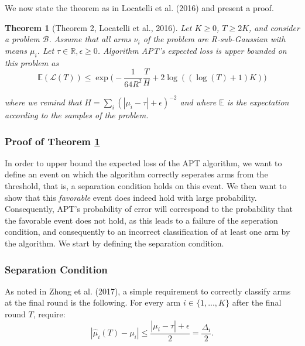 \documentclass[11pt,]{article}
\newtheorem{theorem}{Theorem}
\begin{document}
We now state the theorem as in Locatelli et al. (2016) and present a
proof.

\begin{theorem}[Theorem 2, Locatelli et al., 2016] \label{theorem:LocatelliTheorem4}
Let $K \geq 0$, $T \geq 2K$, and consider a problem $\mathcal{B}$. Assume that all arms $\nu_i$ of the problem are R-sub-Gaussian with means $\mu_i$. Let $\tau \in \mathbb{R}, \epsilon \geq 0$. Algorithm APT's expected loss is upper bounded on this problem as 
\begin{equation*} \mathbb{E}(\mathcal{L}(T)) \leq \exp
\Big(-\frac{1}{64R^2}\frac{T}{H} + 2 \log((\log(T) + 1)K)\Big) \end{equation*}

where we remind that $H = \sum_i (|\mu_i - \tau | + \epsilon)^{-2}$ and where
$\mathbb{E}$ is the expectation according to the samples of the problem.
\end{theorem}

\subsubsection{\texorpdfstring{Proof of Theorem
\ref{theorem:LocatelliTheorem4}
\label{sec:UpperBoundProof}}{Proof of Theorem  }}\label{proof-of-theorem}

In order to upper bound the expected loss of the APT algorithm, we want
to define an event on which the algorithm correctly seperates arms from
the threshold, that is, a separation condition holds on this event. We
then want to show that this \emph{favorable} event does indeed hold with
large probability. Consequently, APT's probability of error will
correspond to the probability that the favorable event does not hold, as
this leads to a failure of the seperation condition, and consequently to
an incorrect classification of at least one arm by the algorithm. We
start by defining the separation condition.

\subsubsection{Separation Condition}\label{separation-condition}

As noted in Zhong et al. (2017), a simple requirement to correctly
classify arms at the final round is the following. For every arm
\(i \in \{1, ..., K\}\) after the final round \(T\), require: \[
| \hat{\mu}_{i}(T) - \mu_i | \leq \frac{|\mu_i - \tau| + \epsilon}{2} = \frac{\Delta_i}{2}.
\]
\end{document}
